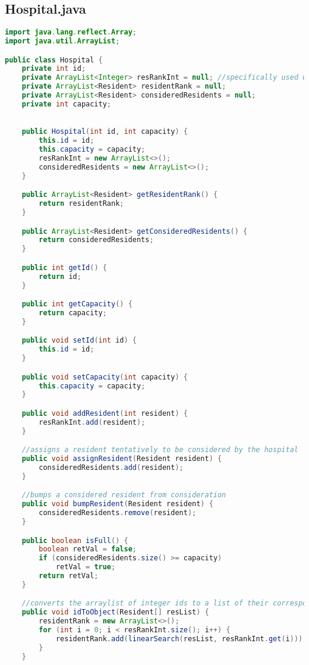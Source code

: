 \documentclass[letterpaper, 10pt,DIV=13]{scrartcl}
\numberwithin{equation}{section} %
\numberwithin{figure}{section} %
\numberwithin{table}{section} %
\begin{document}
\subsection{Hospital.java}
\begin{lstlisting}[frame=single, language=java, breaklines]
import java.lang.reflect.Array;
import java.util.ArrayList;

public class Hospital {
    private int id;
    private ArrayList<Integer> resRankInt = null; //specifically used while parsing. After the file is fully parsed, converted into the Resident ArrayList
    private ArrayList<Resident> residentRank = null;
    private ArrayList<Resident> consideredResidents = null;
    private int capacity;
    

    public Hospital(int id, int capacity) {
        this.id = id;
        this.capacity = capacity;
        resRankInt = new ArrayList<>();
        consideredResidents = new ArrayList<>();
    }

    public ArrayList<Resident> getResidentRank() {
        return residentRank;
    }

    public ArrayList<Resident> getConsideredResidents() {
        return consideredResidents;
    }

    public int getId() {
        return id;
    }

    public int getCapacity() {
        return capacity;
    }

    public void setId(int id) {
        this.id = id;
    }

    public void setCapacity(int capacity) {
        this.capacity = capacity;
    }

    public void addResident(int resident) {
        resRankInt.add(resident);
    }

    //assigns a resident tentatively to be considered by the hospital
    public void assignResident(Resident resident) {
        consideredResidents.add(resident);
    }

    //bumps a considered resident from consideration
    public void bumpResident(Resident resident) {
        consideredResidents.remove(resident);
    }

    public boolean isFull() {
        boolean retVal = false;
        if (consideredResidents.size() >= capacity) 
            retVal = true;
        return retVal;
    }

    //converts the arraylist of integer ids to a list of their corresponding Resident objects, given a list of residen objects. Uses a linear search to do so.
    public void idToObject(Resident[] resList) {
        residentRank = new ArrayList<>();
        for (int i = 0; i < resRankInt.size(); i++) {
            residentRank.add(linearSearch(resList, resRankInt.get(i)));
        }
    }


\end{lstlisting}
\end{document}

